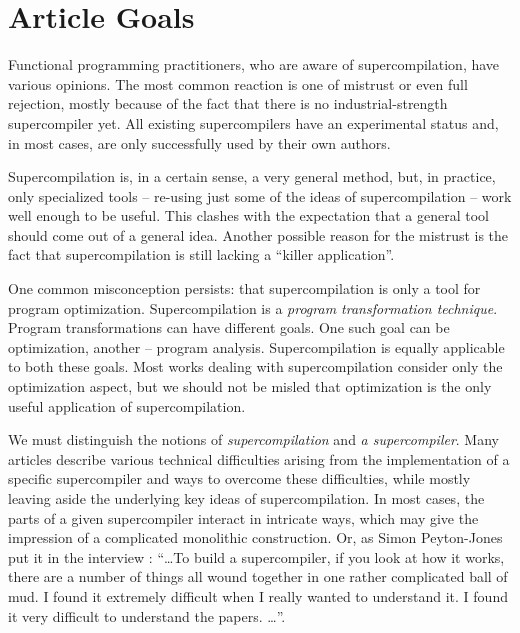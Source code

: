 \section{Article Goals}

%

Functional programming practitioners, who are aware of supercompilation, have various opinions.
The most common reaction is one of mistrust or even full rejection, 
mostly because of the fact that there is no industrial-strength supercompiler yet. 
All existing supercompilers have an experimental status
and, in most cases, are only successfully used by their own authors.

Supercompilation is, in a certain sense, a very general method, but, in practice, only
specialized tools -- re-using just some of the ideas of supercompilation -- work well
enough to be useful. 
This clashes with the expectation that a general tool should come out of a general idea.
Another possible reason for the mistrust is the fact that supercompilation is still lacking a ``killer application''.

One common misconception persists: that supercompilation is only a tool for program optimization.
Supercompilation is a \emph{program transformation technique}.
Program transformations can have different goals.
One such goal can be optimization, another -- program analysis.
Supercompilation is equally applicable to both these goals.
Most works dealing with supercompilation consider only the optimization aspect,
but we should not be misled that optimization is the only useful application of supercompilation.

We must distinguish the notions of \emph{supercompilation} and \emph{a supercompiler}.
Many articles describe various technical difficulties arising from the implementation
of a specific supercompiler and ways to overcome these difficulties, while mostly
leaving aside the underlying key ideas of supercompilation.
In most cases, the parts of a given supercompiler interact in intricate ways, which
may give the impression of a complicated monolithic 
construction.
Or, as Simon Peyton-Jones put it in the interview \cite{Jones2010Interview}:
``\ldots To build a supercompiler, if you look at how it works, there are a number of things all wound together in one rather complicated ball of mud. 
I found it extremely difficult when I really wanted to understand it. 
I found it very difficult to understand the papers. \ldots''.

